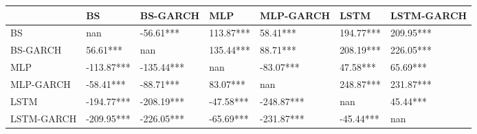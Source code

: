 \begin{tabular}{lllllll}
\toprule
 & BS & BS-GARCH & MLP & MLP-GARCH & LSTM & LSTM-GARCH \\
\midrule
BS & nan & -56.61*** & 113.87*** & 58.41*** & 194.77*** & 209.95*** \\
BS-GARCH & 56.61*** & nan & 135.44*** & 88.71*** & 208.19*** & 226.05*** \\
MLP & -113.87*** & -135.44*** & nan & -83.07*** & 47.58*** & 65.69*** \\
MLP-GARCH & -58.41*** & -88.71*** & 83.07*** & nan & 248.87*** & 231.87*** \\
LSTM & -194.77*** & -208.19*** & -47.58*** & -248.87*** & nan & 45.44*** \\
LSTM-GARCH & -209.95*** & -226.05*** & -65.69*** & -231.87*** & -45.44*** & nan \\
\bottomrule
\end{tabular}
